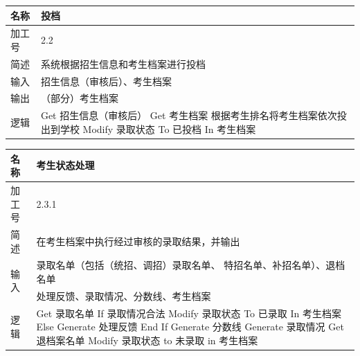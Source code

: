 \documentclass[CJK,utf8]{ctexrep}
\begin{document}
\begin{tabularx}{0.85\textwidth}{|l|X|}
	\hline
	\textbf{名称} & \textbf{投档} \\
	\hline
	加工号 & 2.2 \\
	\hline
	简述 & 系统根据招生信息和考生档案进行投档 \\
	\hline
	输入 & 招生信息（审核后）、考生档案 \\
	\hline
	输出 & （部分）考生档案 \\
	\hline
	\multirow{4}{*}{逻辑} & \ttfamily
	Get 招生信息（审核后） \newline
	Get 考生档案 \newline
	根据考生排名将考生档案依次投出到学校 \newline
	Modify 录取状态 To 已投档 In 考生档案 \\
	\hline
\end{tabularx}

\begin{tabularx}{0.85\textwidth}{|l|X|}
	\hline
	\textbf{名称} & \textbf{考生状态处理} \\
	\hline
	加工号 & 2.3.1 \\
	\hline
	简述 & 在考生档案中执行经过审核的录取结果，并输出 \\
	\hline
	\multirow{2}{*}{输入} & 录取名单（包括（统招、调招）录取名单、
	特招名单、补招名单）、退档名单 \\
	\hline
	输出 & 处理反馈、录取情况、分数线、考生档案 \\
	\hline
	\multirow{10}{*}{逻辑} & \ttfamily
	Get 录取名单 \newline
	If 录取情况合法 \newline
	\hspace*{0.6cm}Modify 录取状态 To 已录取 In 考生档案 \newline
	Else \newline
	\hspace*{0.6cm}Generate 处理反馈 \newline
	End If \newline
	Generate 分数线 \newline
	Generate 录取情况 \newline
	Get 退档案名单 \newline
	Modify 录取状态 to 未录取 in 考生档案 \\
	\hline
\end{tabularx}
\end{document}
